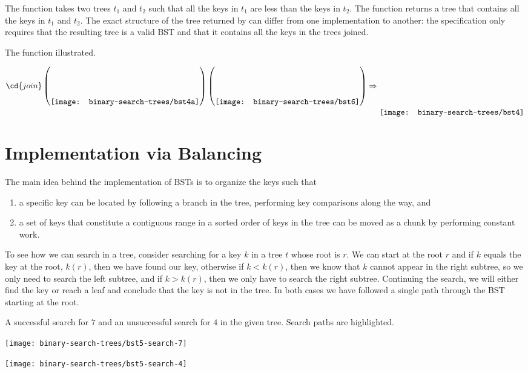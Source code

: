 The function  takes two trees $t_1$ and $t_2$
such that all the keys in $t_1$ are less than the keys in $t_2$.  The
function returns a tree that contains all the keys in $t_1$ and $t_2$.
%
The exact structure of the tree returned by  can differ
from one implementation to another: the specification only requires
that the resulting tree is a valid BST and that it contains all the
keys in the trees joined.



\begin{example}
The function  illustrated.

\[
\cd{join}
\left(
\raisebox{-.27in}{\texttt{[image: binary-search-trees/bst4a]}}
\right)
\left(
\raisebox{-.27in}{\texttt{[image: binary-search-trees/bst6]}}
\right) 
\Rightarrow
\raisebox{-.45in}{\texttt{[image: binary-search-trees/bst4]}}
\]
\end{example}


\section{Implementation via Balancing}
\label{sec:bst::bsts-review}

The main idea behind the implementation of BSTs is to organize the
keys such that
\begin{enumerate}
\item
a specific key can be located by following a branch in the tree,
performing key comparisons along the way, and

\item a set of keys that constitute a contiguous range in a sorted
  order of keys in the tree can be moved as a chunk by performing
  constant work.
\end{enumerate}

To see how we can search in a tree, consider searching for a key $k$
in a tree $t$ whose root is $r$.
%
We can start at the root $r$ and if $k$ equals the key at the root,
$k(r)$, then we have found our key, otherwise if $k < k(r)$, then we
know that $k$ cannot appear in the right subtree, so we only need to
search the left subtree, and if $k > k(r)$, then we only have to
search the right subtree.  Continuing the search, we will either find
the key or reach a leaf and conclude that the key is not in the tree.
%
In both cases we have followed a single path through the BST starting
at the root.

\begin{example}

A successful search for $7$ and an unsuccessful search for $4$ in the
given tree.  Search paths are highlighted.


\begin{center}
\parbox[t]{3cm}
{
\vspace*{0cm}
\texttt{[image: binary-search-trees/bst5-search-7]}\
}
%
\hspace*{3cm}
%
\parbox[t]{3cm}
{
\vspace*{0cm}
\texttt{[image: binary-search-trees/bst5-search-4]}
}
\end{center}
\end{example}

